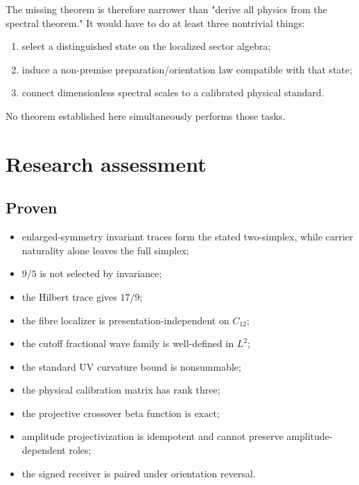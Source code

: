 \documentclass[11pt,a4paper,openany]{report}
\begin{document}
The missing theorem is therefore narrower than "derive all physics from the spectral theorem." It would have to do at least three nontrivial things:

\begin{enumerate}
\item 
select a distinguished state on the localized sector algebra;

\item 
induce a non-premise preparation/\allowbreak{}orientation law compatible with that state;

\item 
connect dimensionless spectral scales to a calibrated physical standard.

\end{enumerate}

No theorem established here simultaneously performs those tasks.

\section{Research assessment}

\subsection{Proven}

\begin{itemize}
\item 
enlarged-symmetry invariant traces form the stated two-simplex, while carrier naturality alone leaves the full simplex;

\item 
\(9/5\) is not selected by invariance;

\item 
the Hilbert trace gives \(17/9\);

\item 
the fibre localizer is presentation-independent on \(C_{12}\);

\item 
the cutoff fractional wave family is well-defined in \(L^2\);

\item 
the standard UV curvature bound is nonsummable;

\item 
the physical calibration matrix has rank three;

\item 
the projective crossover beta function is exact;

\item 
amplitude projectivization is idempotent and cannot preserve amplitude-dependent roles;

\item 
the signed receiver is paired under orientation reversal.

\end{itemize}
\end{document}
